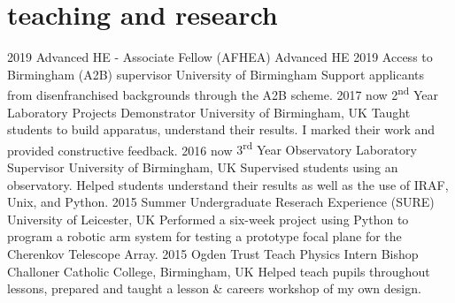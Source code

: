 \documentclass[]{k-cv} %
\begin{document}
\section{teaching and research}
\begin{entrylist}
\centry
{2019}
{Advanced HE - Associate Fellow (AFHEA)}
{Advanced HE}
{}
\centry
{2019}
{Access to Birmingham (A2B) supervisor}
{University of Birmingham}
{Support applicants from disenfranchised backgrounds through the A2B scheme.}
\centry
{2017 \to now}
{2\textsuperscript{nd} Year Laboratory Projects Demonstrator}
{University of Birmingham, UK}
{Taught students to build apparatus, understand their results. I marked their work and provided constructive feedback.}
\centry
{2016 \to now}
{3\textsuperscript{rd} Year Observatory Laboratory Supervisor}
{University of Birmingham, UK}
{Supervised students using an observatory. Helped students understand their results as well as the use of IRAF, Unix, and Python.}
\centry
{2015}
{Summer Undergraduate Reserach Experience (SURE)}
{University of Leicester, UK}
{Performed a six-week project using Python to program a robotic arm system for testing a prototype focal plane for the Cherenkov Telescope Array.}
\centry
{2015}
{Ogden Trust Teach Physics Intern}
{Bishop Challoner Catholic College, Birmingham, UK}
{Helped teach pupils throughout lessons, prepared and taught a lesson \& careers workshop of my own
design.}
\end{entrylist}
\end{document}
